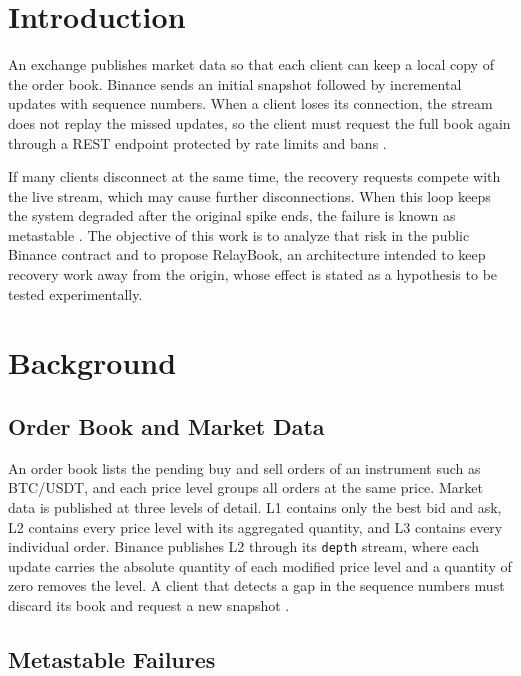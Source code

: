 \documentclass[conference]{IEEEtran}
\begin{document}
\section{Introduction}

An exchange publishes market data so that each client can keep a local copy of the order book. Binance sends an initial snapshot followed by incremental updates with sequence numbers. When a client loses its connection, the stream does not replay the missed updates, so the client must request the full book again through a REST endpoint protected by rate limits and bans \cite{binance-localbook,binance-streams}.

If many clients disconnect at the same time, the recovery requests compete with the live stream, which may cause further disconnections. When this loop keeps the system degraded after the original spike ends, the failure is known as metastable \cite{isaacs2025}. The objective of this work is to analyze that risk in the public Binance contract and to propose RelayBook, an architecture intended to keep recovery work away from the origin, whose effect is stated as a hypothesis to be tested experimentally.

\section{Background}

\subsection{Order Book and Market Data}

An order book lists the pending buy and sell orders of an instrument such as BTC/USDT, and each price level groups all orders at the same price. Market data is published at three levels of detail. L1 contains only the best bid and ask, L2 contains every price level with its aggregated quantity, and L3 contains every individual order. Binance publishes L2 through its \texttt{depth} stream, where each update carries the absolute quantity of each modified price level and a quantity of zero removes the level. A client that detects a gap in the sequence numbers must discard its book and request a new snapshot \cite{binance-localbook}.

\subsection{Metastable Failures}
\end{document}
